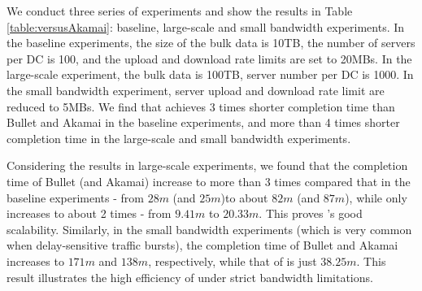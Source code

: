 We conduct three series of experiments and show the results in Table \ref{table:versusAkamai}: baseline, large-scale and small bandwidth experiments. In the baseline experiments, the size of the bulk data is 10TB, the number of servers per DC is 100, and the upload and download rate limits are set to 20MBs. In the large-scale experiment, the bulk data is 100TB, server number per DC is 1000. In the small bandwidth experiment, server upload and download rate limit are reduced to 5MBs. We find that \name achieves 3 times shorter completion time than Bullet and Akamai in the baseline experiments, and more than 4 times shorter completion time in the large-scale and small bandwidth experiments.

Considering the results in large-scale experiments, we found that the completion time of Bullet (and Akamai) increase to more than 3 times compared that in the baseline experiments - from $28m$ (and $25m$)to about $82m$ (and $87m$), while \name only increases to about 2 times - from $9.41m$ to $20.33m$. This proves \name's good scalability. Similarly, in the small bandwidth experiments (which is very common when delay-sensitive traffic bursts), the completion time of Bullet and Akamai increases to $171m$ and $138m$, respectively, while that of \name is just $38.25m$. This result illustrates the high efficiency of \name under strict bandwidth limitations.

\begin{table}[t]
\begin{center}
\end{center}
\label{table:versusAkamai}
\vspace{-0.4cm}
\end{table}

